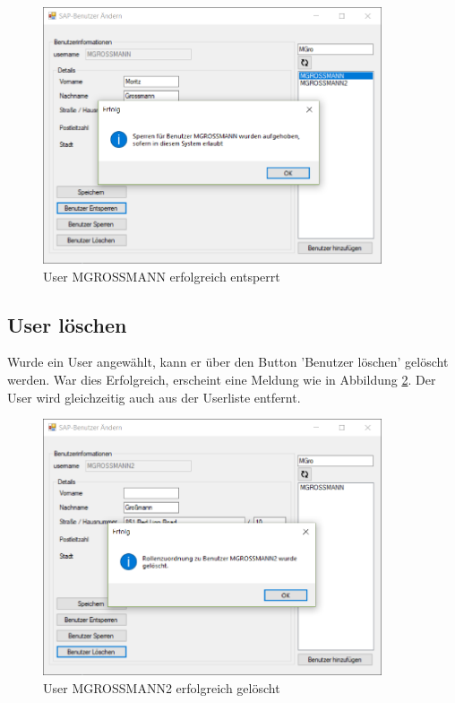 \begin{figure}[h]
	\begin{center}
		\includegraphics[width=10cm]{images/User_Unocked.png}
	\end{center}
	\caption{User MGROSSMANN erfolgreich entsperrt}
	\label{fig:user_unlock}
\end{figure}

\subsection{User löschen}

Wurde ein User angewählt, kann er über den Button 'Benutzer löschen' gelöscht werden. War dies Erfolgreich, erscheint eine Meldung wie in Abbildung \ref{fig:user_delete}. 
Der User wird gleichzeitig auch aus der Userliste entfernt. 

\begin{figure}[h]
	\begin{center}
		\includegraphics[width=10cm]{images/User_Delete.png}
	\end{center}
	\caption{User MGROSSMANN2 erfolgreich gelöscht}
	\label{fig:user_delete}
\end{figure}
